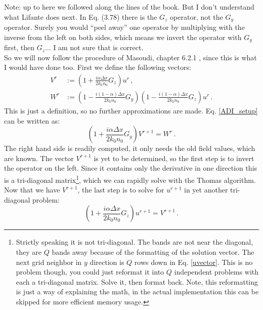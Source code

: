 \documentclass[]{article}
\begin{document}
	Note: up to here we followed along the lines of the book\cite{Lifante_2015}. But I don't understand what Lifante does next. In Eq. (3.78) there is the $G_z$ operator, not the $G_y$ operator. Surely you would ``peel away'' one operator by multiplying with the inverse from the left on both sides, which means we invert the operator with $G_y$ first, then $G_z$... I am not sure that is correct.\\
	
	So we will now follow the procedure of Masoudi, chapter 6.2.1 \cite{masoudi1995parallel}, since this is what I would have done too. First we define the following vectors:
	\begin{subequations}
		\begin{align}
			V^r &:= \left(1+\frac{i\alpha \Delta x}{2k_0 n_0}G_z \right) u^r\, ,\\
			W^r &:= \left(1-\frac{i(1-\alpha) \Delta x}{2k_0 n_0}G_y \right)\left(1-\frac{i(1-\alpha) \Delta x}{2k_0 n_0}G_z \right) u^r \, .
		\end{align}
	\end{subequations}
	This is just a definition, so no further approximations are made. Eq. \eqref{ADI_setup} can be written as:
	\begin{equation}
		\left(1+\frac{i\alpha \Delta x}{2k_0 n_0}G_y \right) V^{r+1} = W^r\, .
	\end{equation}
	The right hand side is readily computed, it only needs the old field values, which are known. The vector $V^{r+1}$ is yet to be determined, so the first step is to invert the operator on the left. Since it contains only the derivative in one direction this is a tri-diagonal matrix\footnote{Strictly speaking it is not tri-diagonal. The bands are not near the diagonal, they are $Q$ bands away because of the formatting of the solution vector. The next grid neighbor in $y$ direction is $Q$ rows down in Eq. \eqref{uvector}. This is no problem though, you could just reformat it into $Q$ independent problems with each a tri-diagonal matrix. Solve it, then format back. Note, this reformatting is just a way of explaining the math, in the actual implementation this can be skipped for more efficient memory usage.}, which we can rapidly solve with the Thomas algorithm. Now that we have $V^{r+1}$, the last step is to solve for $u^{r+1}$ in yet another tri-diagonal problem:
	\begin{equation}
		\left(1+\frac{i\alpha \Delta x}{2k_0 n_0}G_z \right) u^{r+1} = V^{r+1}\, .
	\end{equation}
	
\end{document}
